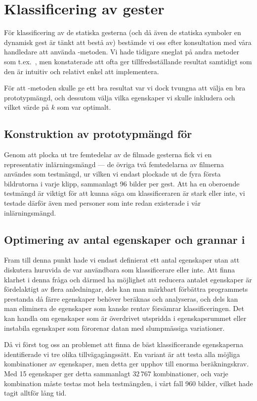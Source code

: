 \documentclass[../rapport_MVEX01-11-05]{subfiles}
\begin{document}
\section{Klassificering av gester} 
För klassificering av de statiska gesterna (och då även de statiska symboler
en dynamisk gest är tänkt att bestå av) bestämde vi oss efter konsultation med
våra handledare att använda \knn-metoden. Vi hade tidigare sneglat på andra
metoder som t.ex.~, men konstaterade att \knn ofta ger
tillfredsställande resultat samtidigt som den är intuitiv och relativt enkel
att implementera.

För att \knn-metoden skulle ge ett bra resultat var vi dock tvungna att välja
en bra prototypmängd, och dessutom välja vilka egenskaper vi skulle inkludera
och vilket värde på $k$ som var optimalt.

\subsection{Konstruktion av prototypmängd för \knn}
Genom att plocka ut tre femtedelar av de filmade gesterna fick vi en
representativ inlärningsmängd --- de övriga två femtedelarna av filmerna 
användes som testmängd, ur vilken vi endast plockade ut
de fyra första bildrutorna i varje klipp, sammanlagt 96 bilder per gest.
Att ha en oberoende testmängd är viktigt för att kunna säga om klassificeraren är
stark eller inte, vi testade därför även med personer som inte redan 
existerade i vår inlärningsmängd.

\subsection{Optimering av antal egenskaper och grannar i \knn}
Fram till denna punkt hade vi endast definierat ett antal egenskaper utan att
diskutera huruvida de var användbara som klassificerare eller inte. Att finna
klarhet i denna fråga och därmed ha möjlighet att reducera antalet egenskaper är
fördelaktigt av flera anledningar, dels kan man märkbart förbättra programmets
prestanda då färre egenskaper behöver beräknas och analyseras, och dels kan man
eliminera de egenskaper som kanske rentav försämrar klassificeringen.
Det kan handla om egenskaper som är överdrivet utspridda i
egenskapsrummet eller instabila egenskaper som förorenar datan med slumpmässiga
variationer.

Då vi först tog oss an problemet att finna de bäst klassificerande
egenskaperna identifierade vi tre olika tillvägagångssätt. En variant är att
testa alla möjliga kombinationer av egenskaper,
men detta ger upphov till enorma beräkningskrav. Med 15
egenskaper ger detta sammanlagt $32\,767$ kombinationer, och varje kombination
måste testas mot hela testmängden, i vårt fall 960 bilder, vilket hade tagit
alltför lång tid.
 
\end{document}
